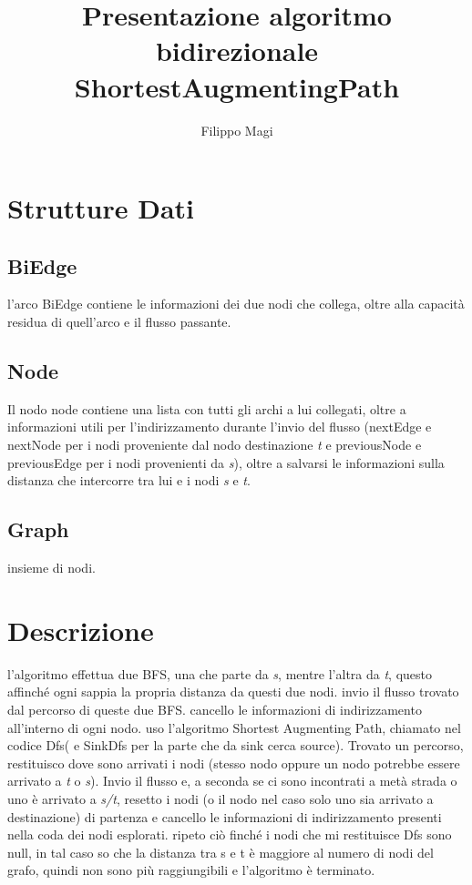 \documentclass{article}
\title{Presentazione algoritmo bidirezionale ShortestAugmentingPath}
\author{Filippo Magi }
\begin{document}
\maketitle

\section{Strutture Dati}

\subsection{BiEdge}

l'arco BiEdge contiene le informazioni dei due nodi che collega, oltre alla capacità residua di quell'arco e il flusso passante.

\subsection{Node}

Il nodo node contiene una lista con tutti gli archi a lui collegati, oltre a informazioni utili per l'indirizzamento durante l'invio del flusso (nextEdge e nextNode per i nodi proveniente dal nodo destinazione \textit{t} e previousNode e previousEdge per i nodi provenienti da \textit{s}), oltre a salvarsi le informazioni sulla distanza che intercorre tra lui e i nodi \textit{s} e \textit{t}.

\subsection{Graph}

insieme di nodi.

\section{Descrizione}

l'algoritmo effettua due BFS, una che parte da \textit{s}, mentre l'altra da \textit{t}, questo affinché ogni sappia la propria distanza da questi due nodi.
invio il flusso trovato dal percorso di queste due BFS.
cancello le informazioni di indirizzamento all'interno di ogni nodo.
uso l'algoritmo Shortest Augmenting Path, chiamato nel codice Dfs( e SinkDfs per la parte che da sink cerca source).
Trovato un percorso, restituisco dove sono arrivati i nodi (stesso nodo oppure un nodo potrebbe essere arrivato a \textit{t} o \textit{s}).
Invio il flusso e, a seconda se ci sono incontrati a metà strada o uno è arrivato a \textit{s/t}, resetto i nodi (o il nodo nel caso solo uno sia arrivato a destinazione) di partenza e cancello le informazioni di indirizzamento presenti nella coda dei nodi esplorati.
ripeto ciò finché i nodi che mi restituisce Dfs sono null, in tal caso so che la distanza tra s e t è maggiore al numero di nodi del grafo, quindi non sono più raggiungibili e l'algoritmo è terminato.
\end{document}
